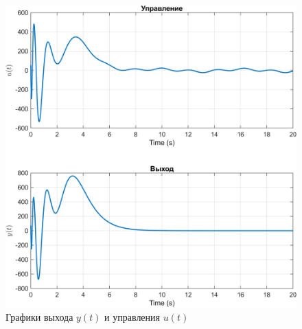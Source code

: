 \begin{figure}[H]
    \centering
    \includegraphics[width=\linewidth]{figs/2_1_0_sim.png}
    \caption{Графики выхода
    $y(t)$ и управления $u(t)$}
    \label{fig:2_1_0_sim}
\end{figure}

